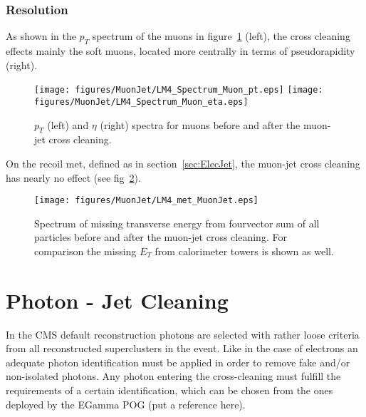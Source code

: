 \documentclass{cmspaper}
\begin{document}
\subsubsection{Resolution}
As shown in the \(p_T\) spectrum of the muons in
figure~\ref{fig:ObjSpectra_MuonJet} (left), the cross cleaning effects mainly
the soft muons, located more centrally in terms of pseudorapidity (right).

\begin{figure}[hb]
\begin{center}
    \texttt{[image: figures/MuonJet/LM4\_Spectrum\_Muon\_pt.eps]}
    \texttt{[image: figures/MuonJet/LM4\_Spectrum\_Muon\_eta.eps]}
    \caption{\(p_T\) (left) and \(\eta\) (right) spectra for muons before and
    after the muon-jet cross cleaning.}
\label{fig:ObjSpectra_MuonJet}
\end{center}
\end{figure} 

On the recoil met, defined as in section~\ref{sec:ElecJet}, the muon-jet cross
cleaning has nearly no effect (see fig~\ref{fig:met_MuonJet}).

\begin{figure}[hb]
\begin{center}
    \texttt{[image: figures/MuonJet/LM4\_met\_MuonJet.eps]}
    \caption{Spectrum of missing transverse energy from fourvector sum of all
    particles before and after the muon-jet cross cleaning. For comparison the
    missing $E_T$ from calorimeter towers is shown as well.}
\label{fig:met_MuonJet}
\end{center}
\end{figure}

\clearpage


\section{Photon - Jet Cleaning}
In the CMS default reconstruction photons are selected with rather loose criteria
from all reconstructed superclusters in the event. Like in the case of electrons
an adequate photon identification must be applied in order to remove fake and/or
non-isolated photons. Any photon entering the cross-cleaning must fulfill the
requirements of a certain identification, which can be chosen from the ones
deployed by the EGamma POG (put a reference here). 
\end{document}

